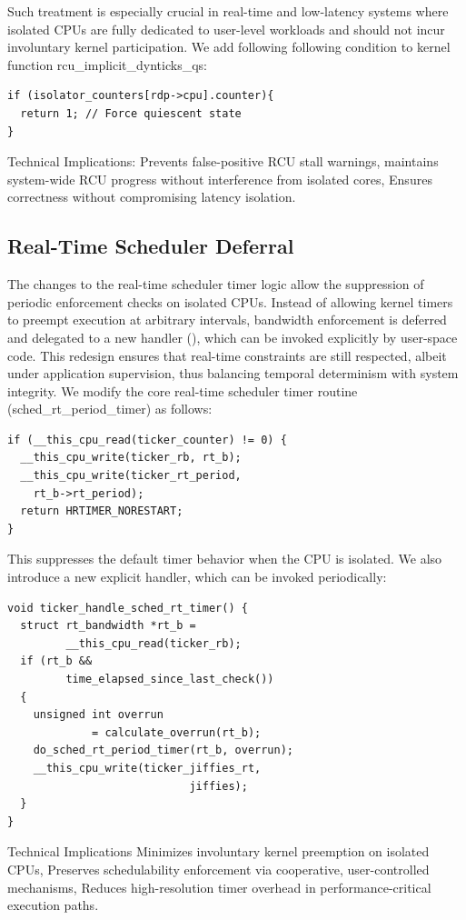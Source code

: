 \documentclass[letterpaper]{article}
\begin{document}
Such treatment is especially crucial in real-time and low-latency systems where isolated CPUs are
fully dedicated to user-level workloads and should not incur involuntary kernel participation.
We add following following condition to kernel function rcu\_implicit\_dynticks\_qs:
\begin{verbatim}
if (isolator_counters[rdp->cpu].counter){
  return 1; // Force quiescent state
}
\end{verbatim}
Technical Implications:
Prevents false-positive RCU stall warnings,
maintains system-wide RCU progress without interference from isolated cores,
Ensures correctness without compromising latency isolation.

\subsection{Real-Time Scheduler Deferral}
The changes to the real-time scheduler timer logic allow the suppression of periodic enforcement
checks on isolated CPUs. Instead of allowing kernel timers to preempt execution at arbitrary
intervals, bandwidth enforcement is deferred and delegated to a new handler (), which can be
invoked explicitly by user-space code.
This redesign ensures that real-time constraints are still respected, albeit under application
supervision, thus balancing temporal determinism with system integrity.
We modify the core real-time scheduler timer routine (sched\_rt\_period\_timer) as follows:
\begin{verbatim}
if (__this_cpu_read(ticker_counter) != 0) {
  __this_cpu_write(ticker_rb, rt_b); 
  __this_cpu_write(ticker_rt_period,
    rt_b->rt_period);
  return HRTIMER_NORESTART;
}
\end{verbatim}
This suppresses the default timer behavior when the CPU is isolated.
We also introduce a new explicit handler, which can be invoked periodically:
\begin{verbatim}
void ticker_handle_sched_rt_timer() {
  struct rt_bandwidth *rt_b =
         __this_cpu_read(ticker_rb);
  if (rt_b &&
         time_elapsed_since_last_check())
  {
    unsigned int overrun
             = calculate_overrun(rt_b);
    do_sched_rt_period_timer(rt_b, overrun);
    __this_cpu_write(ticker_jiffies_rt,
                            jiffies);
  }
}
\end{verbatim}
Technical Implications
Minimizes involuntary kernel preemption on isolated CPUs,
Preserves schedulability enforcement via cooperative, user-controlled mechanisms,
Reduces high-resolution timer overhead in performance-critical execution paths.
\end{document}
